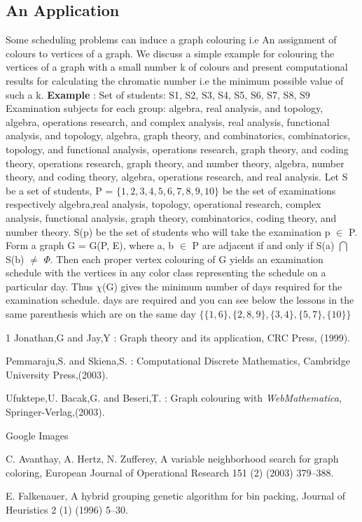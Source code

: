 \documentclass{article}
\begin{document}
\subsection{An Application}
Some scheduling problems can induce a graph colouring i.e An assignment of colours to vertices of a graph. We discuss a simple example for colouring the vertices of a graph with a small number k of colours and present computational results for calculating the chromatic number i.e the minimum possible value of such a k. \hfill \break
\textbf{Example} : Set of students: S1, S2, S3, S4, S5, S6, S7, S8, S9 Examination subjects
for each group: {algebra, real analysis, and topology}, {algebra, operations
research, and complex analysis}, {real analysis, functional analysis, and
topology}, {algebra, graph theory, and combinatorics}, {combinatorics, topology,
and functional analysis}, {operations research, graph theory, and coding
theory}, {operations research, graph theory, and number theory}, {algebra,
number theory, and coding theory}, {algebra, operations research, and real
analysis}. \hfill \break
Let S be a set of students, P = \(\{1, 2, 3, 4, 5, 6, 7, 8, 9, 10\}\) be the set of
examinations respectively algebra,real analysis, topology, operational research,
complex analysis, functional analysis, graph theory, combinatorics, coding
theory, and number theory. S(p) be the set of students who will take the
examination p \(\in\) P. Form a graph G = G(P, E), where a, b \(\in\) P are adjacent if and only if S(a) \( \bigcap\) S(b) \(\neq\)  \(\Phi\). Then each proper vertex colouring of G yields an examination schedule with the vertices in any color class representing the
schedule on a particular day. Thus \(\chi\)(G) gives the minimum number of days required for the examination schedule.  \hfill {} days are required and you can see below the lessons in the same parenthesis which are on the same day
\(\{\{1, 6\}, \{2, 8, 9\}, \{3, 4\}, \{5, 7\}, \{10\}\}\)

  \begin{thebibliography} {1}
 Jonathan,G and Jay,Y : Graph theory and its application, CRC Press, (1999).

 Pemmaraju,S. and Skiena,S. : Computational Discrete Mathematics, Cambridge University Press,(2003).

 Ufuktepe,U. Bacak,G. and Beseri,T. : Graph colouring with \textit{WebMathematica}, Springer-Verlag,(2003).

 Google Images

 C. Avanthay, A. Hertz, N. Zufferey, A variable neighborhood search for graph coloring, European Journal of Operational Research 151 (2) (2003) 379–388. 

 E. Falkenauer, A hybrid grouping genetic algorithm for bin packing, Journal of Heuristics 2 (1) (1996) 5–30. 

\end{thebibliography}
\end{document}
